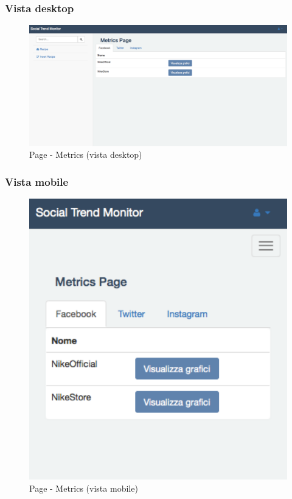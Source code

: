 		\subsubsection{Vista desktop} %
		\begin{figure}[!h]
			\centering
			\centerline{\includegraphics[scale=0.4]{./images/mockup/metrics_vd.pdf}}
			\caption{Page - Metrics (vista desktop)}
		\end{figure}

		\subsubsection{Vista mobile} %

		\begin{figure}[h]
			\centering
			\centerline{\includegraphics[scale=0.5]{./images/mockup/metrics_vm.pdf}}
			\caption{Page - Metrics (vista mobile)}
		\end{figure}

